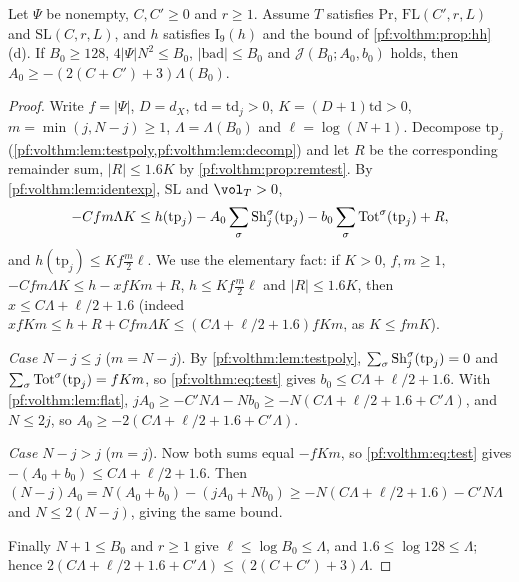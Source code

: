 \begin{proposition}\label{pf:volthm:prop:lowerbase}
Let $\Psi$ be nonempty, $C,C'\ge0$ and $r\ge1$. Assume $T$ satisfies $\mathrm{Pr}$,
$\mathrm{FL}(C',r,L)$ and $\mathrm{SL}(C,r,L)$, and $h$ satisfies $\mathrm{I}_9(h)$ and the bound of
\cref{pf:volthm:prop:hh}(d). If $B_0\ge128$, $4|\Psi|N^2\le B_0$, $|\mathrm{bad}|\le B_0$ and
$\mathcal J(B_0;A_0,b_0)$ holds, then $A_0\ge-(2(C+C')+3)\Lambda(B_0)$.
\end{proposition}

\begin{proof}
Write $f=|\Psi|$, $D=d_X$, $\mathrm{td}=\mathrm{td}_j>0$, $K=(D+1)\mathrm{td}>0$, $m=\min(j,N-j)\ge1$,
$\Lambda=\Lambda(B_0)$ and $\ell=\log(N+1)$. Decompose $\mathrm{tp}_j$ (\cref{pf:volthm:lem:testpoly,pf:volthm:lem:decomp})
and let $R$ be the corresponding remainder sum, $|R|\le1.6K$ by \cref{pf:volthm:prop:remtest}. By
\cref{pf:volthm:lem:identexp}, $\mathrm{SL}$ and $\vol_T>0$,
\begin{equation}\label{pf:volthm:eq:test}
-Cfm\Lambda K\le h(\mathrm{tp}_j)-A_0\sum_\sigma\mathrm{Sh}_j^\sigma(\mathrm{tp}_j)-b_0\sum_\sigma\mathrm{Tot}^\sigma(\mathrm{tp}_j)+R,
\end{equation}
and $h(\mathrm{tp}_j)\le Kf\frac m2\ell$. We use the elementary fact: if $K>0$, $f,m\ge1$,
$-Cfm\Lambda K\le h-xfKm+R$, $h\le Kf\frac m2\ell$ and $|R|\le1.6K$, then $x\le C\Lambda+\ell/2+1.6$ (indeed
$xfKm\le h+R+Cfm\Lambda K\le(C\Lambda+\ell/2+1.6)fKm$, as $K\le fmK$).

\emph{Case $N-j\le j$} ($m=N-j$). By \cref{pf:volthm:lem:testpoly}, $\sum_\sigma\mathrm{Sh}_j^\sigma(\mathrm{tp}_j)=0$ and
$\sum_\sigma\mathrm{Tot}^\sigma(\mathrm{tp}_j)=fKm$, so \eqref{pf:volthm:eq:test} gives $b_0\le C\Lambda+\ell/2+1.6$. With
\cref{pf:volthm:lem:flat}, $jA_0\ge-C'N\Lambda-Nb_0\ge-N(C\Lambda+\ell/2+1.6+C'\Lambda)$, and $N\le2j$, so
$A_0\ge-2(C\Lambda+\ell/2+1.6+C'\Lambda)$.

\emph{Case $N-j>j$} ($m=j$). Now both sums equal $-fKm$, so \eqref{pf:volthm:eq:test} gives
$-(A_0+b_0)\le C\Lambda+\ell/2+1.6$. Then $(N-j)A_0=N(A_0+b_0)-(jA_0+Nb_0)\ge-N(C\Lambda+\ell/2+1.6)-C'N\Lambda$ and
$N\le2(N-j)$, giving the same bound.

Finally $N+1\le B_0$ and $r\ge1$ give $\ell\le\log B_0\le\Lambda$, and $1.6\le\log128\le\Lambda$; hence
$2(C\Lambda+\ell/2+1.6+C'\Lambda)\le(2(C+C')+3)\Lambda$.
\end{proof}

